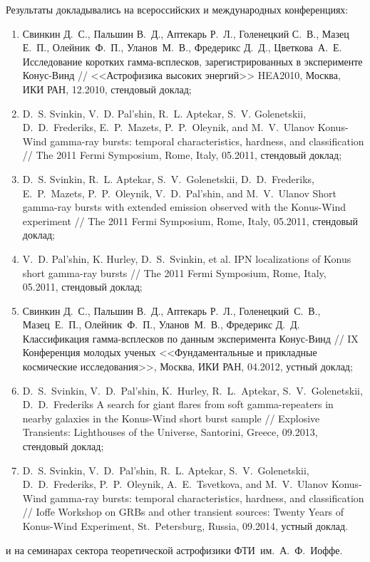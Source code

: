 Результаты докладывались на всероссийских и международных конференциях: 
\begin{enumerate}
\item Свинкин Д.~С., Пальшин В.~Д., Аптекарь Р.~Л., Голенецкий С.~В., Мазец Е.~П., 
    Олейник~Ф.~П., Уланов~М.~В., Фредерикс Д.~Д., Цветкова~А.~Е.  
    Исследование коротких гамма-всплесков, зарегистрированных в эксперименте Конус-Винд //
    <<Астрофизика высоких энергий>> HEA2010, Москва, ИКИ РАН, 12.2010, стендовый доклад;
\item D.~S. Svinkin, V.~D. Pal'shin, R.~L. Aptekar, S.~V. Golenetskii, D.~D.~Frederiks, 
    E.~P.~Mazets, P.~P.~Oleynik, and M.~V.~Ulanov 
    Konus-Wind gamma-ray bursts: temporal characteristics, hardness, and classification //
    The 2011 Fermi Symposium, Rome, Italy, 05.2011, стендовый доклад;
\item D.~S. Svinkin, R.~L. Aptekar, S.~V.~Golenetskii, D.~D.~Frederiks, E.~P.~Mazets,
    P.~P.~Oleynik, V.~D.~Pal'shin, and M.~V.~Ulanov  
    Short gamma-ray bursts with extended emission observed with the Konus-Wind experiment //
    The 2011 Fermi Symposium, Rome, Italy, 05.2011, стендовый доклад;
\item V.~D. Pal'shin, K. Hurley, D.~S.~Svinkin, et al. 
    IPN localizations of Konus short gamma-ray bursts // 
    The 2011 Fermi Symposium, Rome, Italy, 05.2011, стендовый доклад;
\item Свинкин Д.~С., Пальшин В.~Д., Аптекарь Р.~Л., Голенецкий~С.~В., Мазец~Е.~П., 
    Олейник~Ф.~П., Уланов~М.~В., Фредерикс Д.~Д.  
    Классификация гамма-всплесков по данным эксперимента Конус-Винд //
    IX Конференция молодых ученых <<Фундаментальные и прикладные космические исследования>>, 
    Москва, ИКИ РАН, 04.2012, устный доклад;
\item D.~S.~Svinkin, V.~D.~Pal'shin, K.~Hurley, R.~L.~Aptekar, S.~V.~Golenetskii, D.~D.~Frederiks
    A search for giant flares from soft gamma-repeaters in nearby galaxies in the Konus-Wind short burst sample //
    Explosive Transients: Lighthouses of the Universe, Santorini, Greece, 09.2013, стендовый доклад;
\item D.~S. Svinkin, V.~D.~Pal'shin, R.~L. Aptekar, S.~V.~Golenetskii, D.~D.~Frederiks, 
    P.~P.~Oleynik, A.~E.~Tsvetkova, and M.~V.~Ulanov
    Konus-Wind gamma-ray bursts: temporal characteristics, hardness, and classification //
    Ioffe Workshop on GRBs and other transient sources: Twenty Years of Konus-Wind Experiment, 
    St.~Petersburg, Russia, 09.2014, устный доклад.
\end{enumerate}
и на семинарах сектора теоретической астрофизики ФТИ~им.~А.~Ф.~Иоффе.


